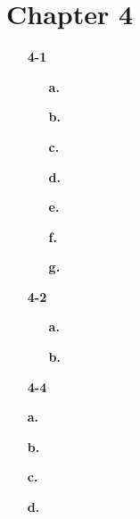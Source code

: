 \documentclass{article}
\begin{document}
\section*{Chapter 4}
\begin{enumerate}

\item[\textbf{4-1}]

\begin{enumerate}

\item[\textbf{a.}]

\item[\textbf{b.}]

\item[\textbf{c.}]

\item[\textbf{d.}]

\item[\textbf{e.}]

\item[\textbf{f.}]

\item[\textbf{g.}]

\end{enumerate}

\item[\textbf{4-2}]

\begin{enumerate}

\item[\textbf{a.}]

\item[\textbf{b.}]

\end{enumerate}

\item[\textbf{4-4}]

\item[\textbf{a.}]

\item[\textbf{b.}]

\item[\textbf{c.}]

\item[\textbf{d.}]

\begin{enumerate}

\end{enumerate}

\end{enumerate}
\end{document}

